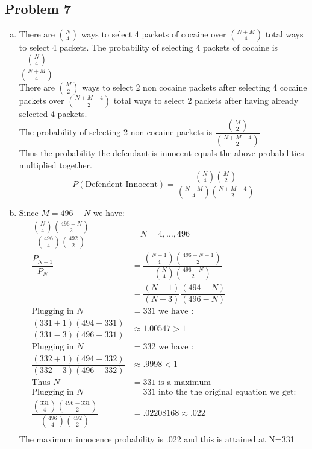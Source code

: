 \documentclass{article}
\begin{document}
\begin{flushleft}
\section*{Problem 7}
\begin{enumerate}[(a)]
	\item
	There are ${N\choose 4}$ ways to select 4 packets of cocaine over ${N+M \choose 4}$ total ways to select 4 packets.
	The probability of selecting 4 packets of cocaine is $\dfrac{{N\choose 4}}{{N+M \choose 4}}$\\
	There are ${M\choose 2}$ ways to select 2 non cocaine packets after selecting 4 cocaine packets over ${N+M-4 \choose 2}$ total ways to select 2 packets after having already selected 4 packets.\\
	The probability of selecting 2 non cocaine packets is $\dfrac{{M\choose 2}}{{N+M-4 \choose 2}}$\\
	Thus the probability the defendant is innocent equals the above probabilities multiplied together.\\
	\[P(\text{Defendent Innocent})=\dfrac{{N\choose 4}{M \choose 2}}{{N+M\choose 4}{N+M-4 \choose 2}}
	\]
	\item 
	Since $M=496-N$ we have:
	\begin{align*}
	\dfrac{{N\choose 4}{496-N \choose 2}}{{496\choose 4}{492 \choose 2}}& \quad N=4,\dots,496\\
	\dfrac{P_{N+1}}{P_N}&=\dfrac{{N+1\choose 4}{496-N-1 \choose 2}}{{N\choose 4}{496-N \choose 2}}\\
	&=\dfrac{(N+1)}{(N-3)}\dfrac{(494-N)}{(496-N)}\\
	\text{Plugging in } N&=331 \text{ we have }:\\
	\dfrac{(331+1)(494-331)}{(331-3)(496-331)}&\approx 1.00547>1\\
	\text{Plugging in } N&=332 \text{ we have }:\\
	\dfrac{(332+1)(494-332)}{(332-3)(496-332)}&\approx .9998<1\\
	\text{Thus } N&=331 \text{ is a maximum }\\
	\text{Plugging in } N&=331 \text{ into the the original equation we get:}\\
	\dfrac{{331\choose 4}{496-331 \choose 2}}{{496\choose 4}{492 \choose 2}}& = .02208168\approx .022\\
	\end{align*}
	The maximum innocence probability is .022 and this is attained at N=331 
\end{enumerate}	

\end{flushleft}
\end{document}
